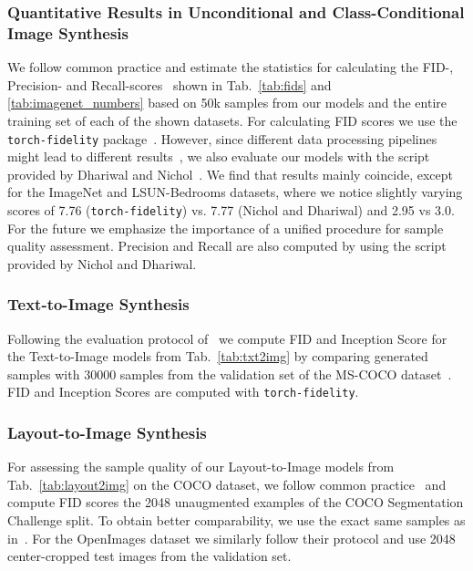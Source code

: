 \documentclass[10pt,twocolumn,letterpaper]{article}
\begin{document}
\subsubsection{Quantitative Results in Unconditional and Class-Conditional Image Synthesis}
\label{suppsubsubsec:fids}
We follow common practice and estimate the statistics for calculating the FID-, Precision- and Recall-scores~\cite{FID,DBLP:journals/corr/abs-1904-06991} shown in Tab.~\ref{tab:fids} and \ref{tab:imagenet_numbers} based on 50k samples from our models and the entire training set of each of the shown datasets. For calculating FID scores we use the \texttt{torch-fidelity} package~\cite{obukhov2020torchfidelity}. However, since different data processing pipelines might lead to different results~\cite{parmar2021cleanfid}, we also evaluate our models with the script provided by Dhariwal and Nichol~\cite{DBLP:journals/corr/abs-2105-05233}. We find that results mainly coincide, except for the ImageNet and LSUN-Bedrooms datasets, where we notice slightly varying scores of 7.76 (\texttt{torch-fidelity}) vs. 7.77 (Nichol and Dhariwal) and 2.95 vs 3.0. For the future we emphasize the importance of a unified procedure for sample quality assessment. Precision and Recall are also computed by using the script provided by Nichol and Dhariwal.

\subsubsection{Text-to-Image Synthesis}
\label{suppsubsubsec:text2img}
%
Following the evaluation protocol of~\cite{DBLP:journals/corr/abs-2102-12092} we compute FID and Inception Score for the Text-to-Image models from Tab.~\ref{tab:txt2img} by comparing generated samples with 30000 samples from the validation set of the MS-COCO dataset~\cite{DBLP:journals/corr/LinMBHPRDZ14}. FID and Inception Scores are computed with \texttt{torch-fidelity}.

\subsubsection{Layout-to-Image Synthesis}
\label{suppsubsubsec:layout2img}
For assessing the sample quality of our Layout-to-Image models from Tab.~\ref{tab:layout2img} on the COCO dataset, we follow common practice~\cite{DBLP:conf/aaai/SylvainZBH021,DBLP:journals/corr/abs-2105-06458,DBLP:journals/corr/abs-2003-11571} and compute FID scores the 2048 unaugmented examples of the COCO Segmentation Challenge split. To obtain better comparability, we use the exact same samples as in~\cite{DBLP:journals/corr/abs-2105-06458}. For the OpenImages dataset we similarly follow their protocol and use 2048 center-cropped test images from the validation set.
\end{document}
